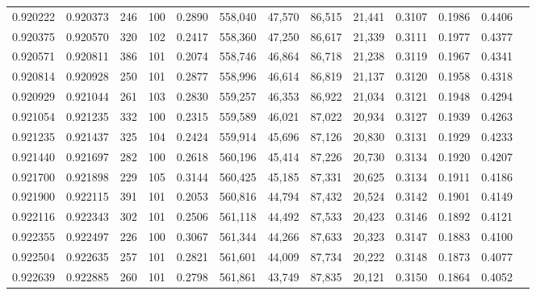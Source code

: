 \begin{tabular}{rrrrrrrrrrrrr}
0.920222 & 0.920373 &   246 & 100 &                                     0.2890 & 558,040 &  47,570 &  86,515 &  21,441 & 0.3107 & 0.1986 & 0.4406 \\
0.920375 & 0.920570 &   320 & 102 &                                     0.2417 & 558,360 &  47,250 &  86,617 &  21,339 & 0.3111 & 0.1977 & 0.4377 \\
0.920571 & 0.920811 &   386 & 101 &                                     0.2074 & 558,746 &  46,864 &  86,718 &  21,238 & 0.3119 & 0.1967 & 0.4341 \\
0.920814 & 0.920928 &   250 & 101 &                                     0.2877 & 558,996 &  46,614 &  86,819 &  21,137 & 0.3120 & 0.1958 & 0.4318 \\
0.920929 & 0.921044 &   261 & 103 &                                     0.2830 & 559,257 &  46,353 &  86,922 &  21,034 & 0.3121 & 0.1948 & 0.4294 \\
0.921054 & 0.921235 &   332 & 100 &                                     0.2315 & 559,589 &  46,021 &  87,022 &  20,934 & 0.3127 & 0.1939 & 0.4263 \\
0.921235 & 0.921437 &   325 & 104 &                                     0.2424 & 559,914 &  45,696 &  87,126 &  20,830 & 0.3131 & 0.1929 & 0.4233 \\
0.921440 & 0.921697 &   282 & 100 &                                     0.2618 & 560,196 &  45,414 &  87,226 &  20,730 & 0.3134 & 0.1920 & 0.4207 \\
0.921700 & 0.921898 &   229 & 105 &                                     0.3144 & 560,425 &  45,185 &  87,331 &  20,625 & 0.3134 & 0.1911 & 0.4186 \\
0.921900 & 0.922115 &   391 & 101 &                                     0.2053 & 560,816 &  44,794 &  87,432 &  20,524 & 0.3142 & 0.1901 & 0.4149 \\
0.922116 & 0.922343 &   302 & 101 &                                     0.2506 & 561,118 &  44,492 &  87,533 &  20,423 & 0.3146 & 0.1892 & 0.4121 \\
0.922355 & 0.922497 &   226 & 100 &                                     0.3067 & 561,344 &  44,266 &  87,633 &  20,323 & 0.3147 & 0.1883 & 0.4100 \\
0.922504 & 0.922635 &   257 & 101 &                                     0.2821 & 561,601 &  44,009 &  87,734 &  20,222 & 0.3148 & 0.1873 & 0.4077 \\
0.922639 & 0.922885 &   260 & 101 &                                     0.2798 & 561,861 &  43,749 &  87,835 &  20,121 & 0.3150 & 0.1864 & 0.4052 \\

\end{tabular}
